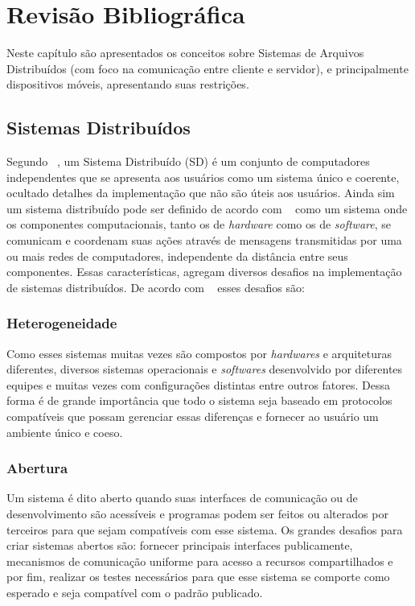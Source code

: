 
\chapter{Revisão Bibliográfica}
\label{cap2}


Neste capítulo são apresentados os conceitos sobre Sistemas de Arquivos Distribuídos (com foco na comunicação entre cliente e servidor), e principalmente dispositivos móveis, apresentando suas restrições.


\section{Sistemas Distribuídos}

    Segundo ~\cite{tanenbaum}, um Sistema Distribuído (SD) é um conjunto de computadores independentes que se apresenta aos usuários como um sistema único e coerente, ocultado detalhes da implementação que não são úteis aos usuários. Ainda sim um sistema distribuído pode ser definido de acordo com ~\cite{coulouris} como um sistema onde os componentes computacionais, tanto os de \textit{hardware} como os de \textit{software}, se comunicam e coordenam suas ações através de mensagens transmitidas por uma ou mais redes de computadores, independente da distância entre seus componentes. Essas características, agregam diversos desafios na implementação de sistemas distribuídos. De acordo com ~\cite{coulouris} esses desafios são:
    
    \subsection{Heterogeneidade}
        Como esses sistemas muitas vezes são compostos por \textit{hardwares} e arquiteturas diferentes, diversos sistemas operacionais e \textit{softwares} desenvolvido por diferentes equipes e muitas vezes com configurações distintas entre outros fatores. Dessa forma é de grande importância que todo o sistema seja baseado em protocolos compatíveis que possam gerenciar essas diferenças e fornecer ao usuário um ambiente único e coeso.
    
    \subsection{Abertura}
        Um sistema é dito aberto quando suas interfaces de comunicação ou de desenvolvimento são acessíveis e programas podem ser feitos ou alterados por terceiros para que sejam compatíveis com esse sistema. Os grandes desafios para criar sistemas abertos são: fornecer principais interfaces publicamente, mecanismos de comunicação uniforme para acesso a recursos compartilhados e por fim, realizar os testes necessários para que esse sistema se comporte como esperado e seja compatível com o padrão publicado.
    

